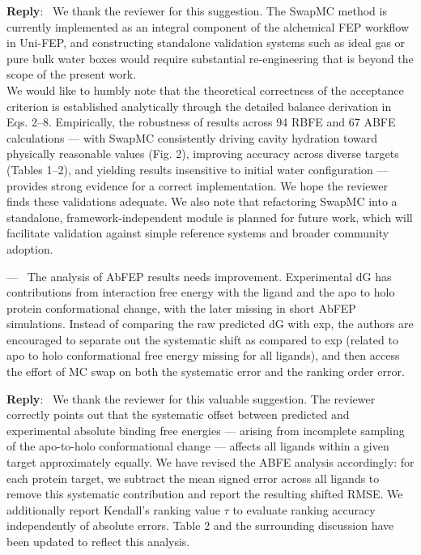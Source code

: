 \documentclass[doublespace,prb,aps]{article}
\newcounter{reviewer}
\newcounter{point}[reviewer]
\renewcommand{\thepoint}{Comment\,\thereviewer.\arabic{point}}
\newenvironment{point}
   {\refstepcounter{point} \bigskip \noindent {\textbf{Reviewer~\thepoint} } ---\ }
   {\par }
\newenvironment{reply}
   {\medskip \noindent \color{black} \begin{sf}\textbf{Reply}:\  }
   {\medskip \par \end{sf}}
\begin{document}
\begin{reply}
We thank the reviewer for this suggestion. 
The SwapMC method is currently implemented as an integral component of the alchemical FEP workflow in Uni-FEP, 
and constructing standalone validation systems such as ideal gas or pure bulk water boxes 
would require substantial re-engineering that is beyond the scope of the present work. \\
\newline
We would like to humbly note that the theoretical correctness of the acceptance criterion is established analytically through the detailed balance derivation in Eqs. 2–8. 
Empirically, the robustness of results across 94 RBFE and 67 ABFE calculations 
— with SwapMC consistently driving cavity hydration toward physically reasonable values (Fig. 2), 
improving accuracy across diverse targets (Tables 1–2), 
and yielding results insensitive to initial water configuration 
— provides strong evidence for a correct implementation. 
We hope the reviewer finds these validations adequate. 
We also note that refactoring SwapMC into a standalone, 
framework-independent module is planned for future work, 
which will facilitate validation against simple reference systems and broader community adoption.
\end{reply}

\begin{point}
The analysis of AbFEP results needs improvement. 
Experimental dG has contributions from interaction free energy with the ligand and the apo to holo protein conformational change, 
with the later missing in short AbFEP simulations. 
Instead of comparing the raw predicted dG with exp, the authors are encouraged to separate out the systematic shift as compared to exp (related to apo to holo conformational free energy missing for all ligands), 
and then access the effort of MC swap on both the systematic error and the ranking order error. \label{comment_23}
\end{point}

\begin{reply}
We thank the reviewer for this valuable suggestion. 
The reviewer correctly points out that the systematic offset between predicted and experimental absolute binding free energies 
— arising from incomplete sampling of the apo-to-holo conformational change — affects all ligands within a given target approximately equally. 
We have revised the ABFE analysis accordingly: for each protein target, we subtract the mean signed error across all ligands to remove this systematic contribution and report the resulting shifted RMSE. 
We additionally report Kendall's ranking value $\tau$ to evaluate ranking accuracy independently of absolute errors. 
Table 2 and the surrounding discussion have been updated to reflect this analysis.
\end{reply}
\end{document}
